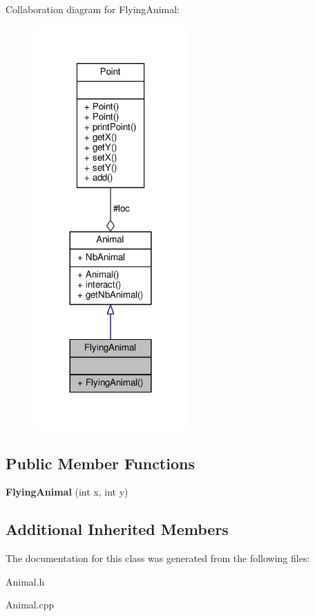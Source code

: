 Collaboration diagram for Flying\+Animal\+:
\nopagebreak
\begin{figure}[H]
\begin{center}
\leavevmode
\includegraphics[width=168pt]{classFlyingAnimal__coll__graph}
\end{center}
\end{figure}
\subsection*{Public Member Functions}
\begin{DoxyCompactItemize}
\item 
{\bfseries Flying\+Animal} (int x, int y)\hypertarget{classFlyingAnimal_a33fd442c27cb6f96404d274a69b44a9c}{}\label{classFlyingAnimal_a33fd442c27cb6f96404d274a69b44a9c}

\end{DoxyCompactItemize}
\subsection*{Additional Inherited Members}


The documentation for this class was generated from the following files\+:\begin{DoxyCompactItemize}
\item 
Animal.\+h\item 
Animal.\+cpp\end{DoxyCompactItemize}

